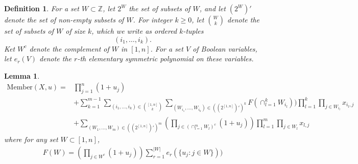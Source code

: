 \documentclass[11pt, oneside]{article}   	%
\newtheorem{lemma}{Lemma}
\newtheorem{definition}{Definition}
\begin{document}
\begin{definition} 
For a set $W \subset \mathbb{Z}$, let $2^W$ the set of subsets of $W$, and let $(2^W)'$ denote the set of non-empty subsets of $W$. For integer $k \geq 0$, let ${W \choose k}$ denote the set of subsets of $W$ of size $k$, which we write as ordered $k$-tuples 
\[
(i_1, \ldots, i_k).
\]  
Ket $W^c$ denote the complement of $W$ in $[1,n]$. 
For a set $V$ of Boolean variables, let $e_r(V)$ denote the $r$-th elementary symmetric polynomial on these variables. 
\end{definition}
\begin{lemma} \label{l Member}
\begin{align*}
\mathrm{Member}(X,u) = &\prod_{j=1}^n (1+u_j)\\ 
 &+\sum_{k=1}^{m-1} \sum_{(i_1, \ldots, i_k) \in {[1,n] \choose k}} \sum_{(W_{i_1}, \ldots, W_{i_k}) \in ((2^{[1,n]} )' )^k} F( \cap_{l=1}^k W_{i_l}))\prod_{l=1}^k   \prod_{j \in W_{i_l}} x_{i_l, j}\\ &+\sum_{(W_{1}, \ldots, W_{m}) \in ((2^{[1,n]} )' )^m} (\prod_{j \in (\cap_{l=1}^m W_l)^c} (1+u_j) )
 \prod_{l=1}^m \prod_{j \in W_{l}} x_{l, j}\end{align*}
where for any set $W \subset [1,n]$, 
\begin{align*}
 F(W)= (\prod_{j \in W^c} (1+u_j)  ) \sum_{r=1}^{|W|} e_r(\{ u_j \colon j \in W\})) 
\end{align*}

\end{lemma}
\end{document}
